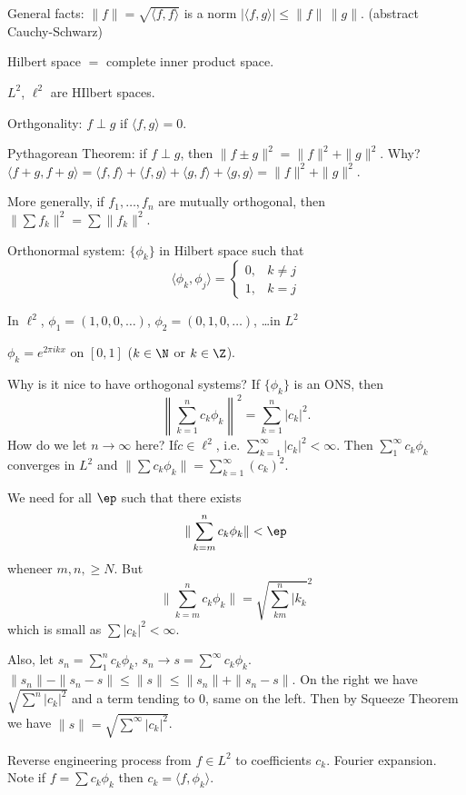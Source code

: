 General facts:
$\|f\|= \sqrt{ \langle f,f \rangle}$ is a norm
$|\langle f,g \rangle| \leq \|f\| \, \|g\|$. (abstract Cauchy-Schwarz)


Hilbert space $=$ complete inner product space.

$L^2$, $\ell^2$ are HIlbert spaces.

Orthgonality: $f \perp g$ if $\langle f,g \rangle= 0$. 

Pythagorean Theorem: if $f \perp g$, then $\|f \pm g\|^2 = \|f\|^2 + \|g\|^2$. Why? $\langle f+g, f+g \rangle= \langle f,f \rangle + \langle f,g \rangle + \langle g,f \rangle + \langle g,g \rangle= \|f\|^2 + \|g\|^2$. 

More generally, if $f_1,\ldots,f_n$ are mutually orthogonal, then $\| \sum f_k \|^2= \sum \|f_k\|^2$. 


Orthonormal system: $\{ \phi_k\}$ in Hilbert space such that
	\[
	\langle \phi_k, \phi_j \rangle=
	\begin{cases}
	0, & k \neq j \\
	1, & k=j
	\end{cases}
	\]


\begin{ex}
In $\ell^2$, $\phi_1=(1,0,0,\ldots)$, $\phi_2= (0,1,0,\ldots)$, \dots in $L^2$
\end{ex}


\begin{ex}
$\phi_k = e^{2\pi i kx}$ on $[0,1]$ ($k \in \N$ or $k \in \Z$). 
\end{ex}


Why is it nice to have orthogonal systems? If $\{ \phi_k \}$ is an ONS, then 
	\[
	\left\| \sum_{k=1}^n c_k \phi_k \right\|^2= \sum_{k=1}^n |c_k|^2. 
	\]
How do we let $n \to \infty$ here? If$c \in \ell^2$, i.e. $\sum_{k=1}^\infty |c_k|^2<\infty$. Then $\sum_1^\infty c_k \phi_k$ converges in $L^2$ and $\| \sum c_k \phi_k\|= \sum_{k=1}^\infty (c_k)^2$.

\pf We need for all $\ep$ such that there exists
	\[
	\| \sum_{k=m}^n c_k \phi_k \| < \ep
	\]
wheneer $m,n, \geq N$. But
	\[
	\| \sum_{k=m}^n c_k \phi_k \| = \sqrt{\sum_{km}^n |k_k}^2
	\]
which is small as $\sum |c_k|^2< \infty$. 


Also, let $s_n= \sum_1^n c_k \phi_k$, $s_n \to s= \sum^\infty c_k \phi_k$. $\|s_n\| - \|s_n-s\| \leq \|s\| \leq \|s_n\| + \|s_n-s\|$. On the right we have $\sqrt{\sum^n |c_k|^2}$ and a term tending to 0, same on the left. Then by Squeeze Theorem we have $\|s\|= \sqrt{\sum^\infty |c_k|^2}$. 


Reverse engineering process from $f \in L^2$ to coefficients $c_k$. Fourier expansion. Note if $f= \sum c_k \phi_k$ then $c_k = \langle f, \phi_k \rangle$. 

